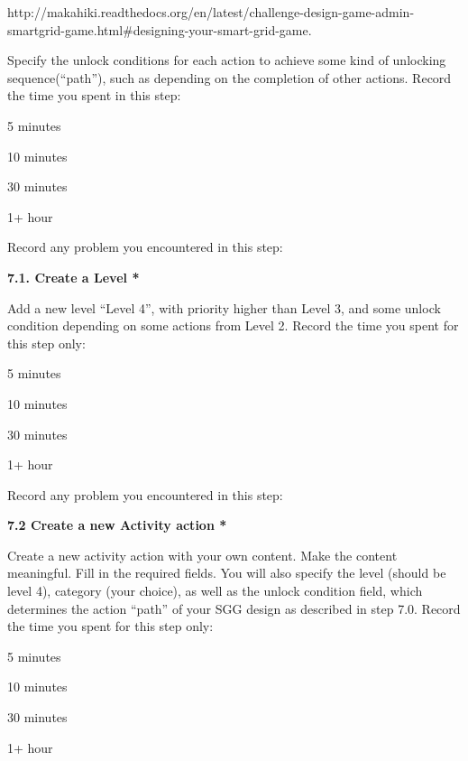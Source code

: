 http://makahiki.readthedocs.org/en/latest/challenge-design-game-admin-smartgrid-game.html\#designing-your-smart-grid-game. 

Specify the unlock conditions for each action to achieve some kind of unlocking sequence(``path''), such as depending on the completion of other actions. Record the time you spent in this step:

\begin{radiobutton}
\item 5 minutes
\item  10 minutes
\item  30 minutes
\item  1+ hour
\end{radiobutton}


Record any problem you encountered in this step: \underline{\hspace{4cm}}

{\bf 7.1. Create a Level *}

Add a new level ``Level 4'', with priority higher than Level 3, and some unlock condition depending on some actions from Level 2. Record the time you spent for this step only:

\begin{radiobutton}
\item 5 minutes
\item  10 minutes
\item  30 minutes
\item  1+ hour
\end{radiobutton}


Record any problem you encountered in this step: \underline{\hspace{4cm}}

{\bf 7.2 Create a new Activity action *}

Create a new activity action with your own content. Make the content meaningful. Fill in the required fields. You will also specify the level (should be level 4), category (your choice), as well as the unlock condition field, which determines the action ``path'' of your SGG design as described in step 7.0. Record the time you spent for this step only:

\begin{radiobutton}
\item 5 minutes
\item  10 minutes
\item  30 minutes
\item  1+ hour
\end{radiobutton}

